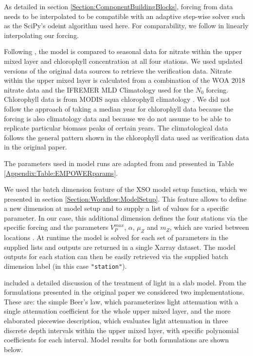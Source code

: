 \documentclass[journal abbreviation, manuscript]{copernicus}
\begin{document}
As detailed in section \ref{Section:ComponentBuildingBlocks}, forcing from data needs to be interpolated to be compatible with an adaptive step-wise solver such as the SciPy's odeint algorithm used here. For comparability, we follow \citet{Anderson2015c} in linearly interpolating our forcing.

Following \citet{Anderson2015c}, the model is compared to seasonal data for nitrate within the upper mixed layer and chlorophyll concentration at all four stations. We used updated versions of the original data sources to retrieve the verification data. Nitrate within the upper mixed layer is calculated from a combination of the WOA 2018 nitrate data and the IFREMER MLD Climatology used for the $N_0$ forcing. Chlorophyll data is from MODIS aqua chlorophyll climatology \citep{NASAGoddardSpaceFlightCenterOceanEcologyLaboratoryOceanBiologyProcessingGroup}. We did not follow the approach of taking a median year for chlorophyll data because the forcing is also climatology data and because we do not assume to be able to replicate particular biomass peaks of certain years. The climatological data follows the general pattern shown in the chlorophyll data used as verification data in the original paper.


The parameters used in model runs are adapted from \citet{Anderson2015c} and presented in Table \ref{Appendix:Table:EMPOWERparams}.

We used the batch dimension feature of the XSO model setup function, which we presented in section \ref{Section:Workflow:ModelSetup}. This feature allows to define a new dimension at model setup and to supply a list of values for a specific parameter. In our case, this additional dimension defines the four stations via the specific forcing and the parameters $V_P^{max}$, $\alpha$, $\mu_Z$ and $m_Z$, which are varied between locations \citep{Anderson2015c}. At runtime the model is solved for each set of parameters in the supplied lists and outputs are returned in a single Xarray dataset. The model outputs for each station can then be easily retrieved via the supplied batch dimension label (in this case \texttt{"station"}).

\citet{Anderson2015c} included a detailed discussion of the treatment of light in a slab model. From the formulations presented in the original paper we considered two implementations. These are: the simple Beer's law, which parameterizes light attenuation with a single attenuation coefficient for the whole upper mixed layer, and the more elaborated piecewise description, which evaluates light attenuation in three discrete depth intervals within the upper mixed layer, with specific polynomial coefficients for each interval. Model results for both formulations are shown below.
\end{document}
